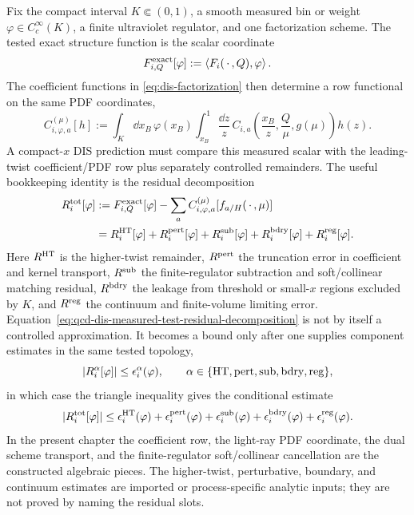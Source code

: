 \begin{remark}
\label{rem:qcd-dis-measured-test-functional-map}
Fix the compact interval \(K\Subset(0,1)\), a smooth measured bin or weight
\(\varphi\in C_c^\infty(K)\), a finite ultraviolet regulator, and one
factorization scheme.  The tested exact structure function is the scalar
coordinate
\[
  F_{i,Q}^{\rm exact}[\varphi]
  :=
  \left\langle F_i(\,\cdot\,,Q),\varphi\right\rangle .
\]
The coefficient functions in \eqref{eq:dis-factorization} then determine a
row functional on the same PDF coordinates,
\begin{equation}
  C_{i,\varphi,a}^{(\mu)}[h]
  :=
  \int_K\dd x_B\,\varphi(x_B)
  \int_{x_B}^1\frac{\dd z}{z}\,
  C_{i,a}\!\left(\frac{x_B}{z},\frac{Q}{\mu},g(\mu)\right)h(z).
  \label{eq:qcd-dis-measured-coefficient-row}
\end{equation}
A compact-\(x\) DIS prediction must compare this measured scalar with the
leading-twist coefficient/PDF row plus separately controlled remainders.  The
useful bookkeeping identity is the residual decomposition
\begin{equation}
\begin{aligned}
  R_i^{\rm tot}[\varphi]
  &:=
  F_{i,Q}^{\rm exact}[\varphi]
  -
  \sum_a C_{i,\varphi,a}^{(\mu)}[f_{a/H}(\,\cdot\,,\mu)]
  \\
  &=
  R_i^{\rm HT}[\varphi]
  +R_i^{\rm pert}[\varphi]
  +R_i^{\rm sub}[\varphi]
  +R_i^{\rm bdry}[\varphi]
  +R_i^{\rm reg}[\varphi].
\end{aligned}
  \label{eq:qcd-dis-measured-test-residual-decomposition}
\end{equation}
Here \(R^{\rm HT}\) is the higher-twist remainder, \(R^{\rm pert}\) the
truncation error in coefficient and kernel transport, \(R^{\rm sub}\) the
finite-regulator subtraction and soft/collinear matching residual,
\(R^{\rm bdry}\) the leakage from threshold or small-\(x\) regions excluded by
\(K\), and \(R^{\rm reg}\) the continuum and finite-volume limiting error.
Equation~\eqref{eq:qcd-dis-measured-test-residual-decomposition} is not by
itself a controlled approximation.  It becomes a bound only after one supplies
component estimates in the same tested topology,
\[
  |R_i^\alpha[\varphi]|\le\epsilon_i^\alpha(\varphi),
  \qquad
  \alpha\in\{{\rm HT,pert,sub,bdry,reg}\},
\]
in which case the triangle inequality gives the conditional estimate
\[
  |R_i^{\rm tot}[\varphi]|
  \le
  \epsilon_i^{\rm HT}(\varphi)
  +\epsilon_i^{\rm pert}(\varphi)
  +\epsilon_i^{\rm sub}(\varphi)
  +\epsilon_i^{\rm bdry}(\varphi)
  +\epsilon_i^{\rm reg}(\varphi).
\]
In the present chapter the coefficient row, the light-ray PDF coordinate, the
dual scheme transport, and the finite-regulator soft/collinear cancellation
are the constructed algebraic pieces.  The higher-twist, perturbative,
boundary, and continuum estimates are imported or process-specific analytic
inputs; they are not proved by naming the residual slots.


\end{remark}
